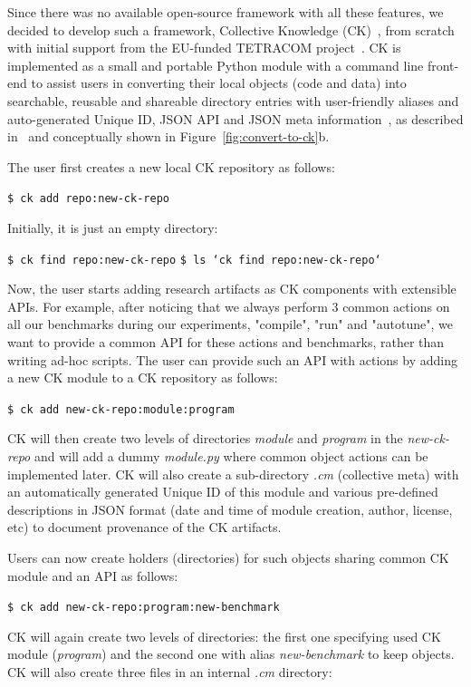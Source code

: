 Since there was no available open-source framework with all these features,
we decided to develop such a framework, Collective Knowledge (CK)~\cite{ck,ck-date16}, 
from scratch with initial support from the EU-funded TETRACOM project~\cite{tetracom}.
%
CK is implemented as a small and portable Python module with a command line
front-end to assist users in converting their local objects (code and data)
into searchable, reusable and shareable directory entries with user-friendly
aliases and auto-generated Unique ID, JSON API and JSON meta
information~\cite{json-org}, as described in~\cite{ck-date16,ck-concepts} and 
conceptually shown in Figure~\ref{fig:convert-to-ck}b.

The user first creates a new local CK repository as follows:
\begin{flushleft}
\texttt{\$ ck add repo:new-ck-repo}
\end{flushleft}

Initially, it is just an empty directory:
\begin{flushleft}
\texttt{\$ ck find repo:new-ck-repo} \newline
\texttt{\$ ls `ck find repo:new-ck-repo`}
\end{flushleft}

Now, the user starts adding research artifacts as CK components with extensible APIs.
%
For example, after noticing that we always perform 3 common actions on all our benchmarks
during our experiments, "compile", "run" and "autotune", we want to provide a common
API for these actions and benchmarks, rather than writing ad-hoc scripts.
%
The user can provide such an API with actions by adding a new CK module to a CK repository as follows:
\begin{flushleft}
\texttt{\$ ck add new-ck-repo:module:program}
\end{flushleft}
%
CK will then create two levels of directories \textit{module} and \textit{program} in the \textit{new-ck-repo}
and will add a dummy \textit{module.py} where common object actions can be implemented later.
%
CK will also create a sub-directory \textit{.cm} (collective meta) 
with an automatically generated Unique ID of this module and various pre-defined 
descriptions in JSON format (date and time of module creation, author, license, etc)
to document provenance of the CK artifacts.

Users can now create holders (directories) for such objects sharing common CK module and an API as follows:
\begin{flushleft}
\texttt{\$ ck add new-ck-repo:program:new-benchmark}
\end{flushleft}
%
CK will again create two levels of directories: 
the first one specifying used CK module (\textit{program}) 
and the second one with alias \textit{new-benchmark} 
to keep objects.
%
CK will also create three files in an internal \textit{.cm} directory:

